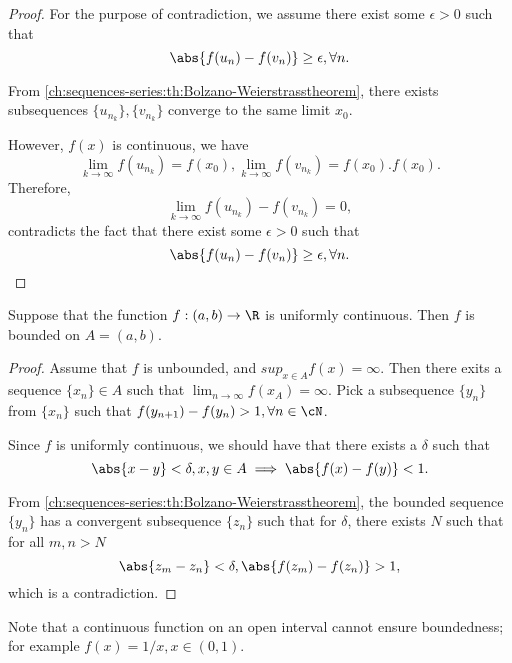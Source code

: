 \begin{refsection}
\begin{proof}
For the purpose of contradiction, we assume there exist some $\epsilon > 0$ such that 
$$\abs{f(u_n) - f(v_n)} \geq \epsilon, \forall n.$$

From \autoref{ch:sequences-series:th:Bolzano-Weierstrasstheorem}, there exists subsequences $\{u_{n_k}\},\{v_{n_k}\}$ converge to the same limit $x_0$.



However, $f(x)$ is continuous, we have
$$\lim_{k\to\infty} f(u_{n_k}) = f(x_0),\lim_{k\to\infty} f(v_{n_k}) = f(x_0). f(x_0).$$
Therefore, $$\lim_{k\to\infty} f(u_{n_k}) - f(v_{n_k}) = 0,$$
contradicts the fact that 	there exist some $\epsilon > 0$ such that 
$$\abs{f(u_n) - f(v_n)} \geq \epsilon, \forall n.$$
\end{proof}


\begin{lemma}
Suppose that the function $f:(a,b)\to \R$ is uniformly continuous. Then $f$ is bounded on $A = (a,b)$.	
\end{lemma}
\begin{proof}
Assume that $f$ is unbounded, and $sup_{x\in A}f(x) = \infty.$ Then there exits a sequence $\{x_n\}\in A$ such that $\lim_{n\to \infty} f(x_A) = \infty.$
Pick a subsequence $\{y_n\}$ from $\{x_n\}$ such that $f(y_{n+1}) - f(y_n) > 1, \forall n\in \cN$. 

Since $f$ is uniformly continuous, we should have that there exists a $\delta$ such that
$$\abs{x-y}<\delta, x,y\in A \implies \abs{f(x)-f(y)} < 1.$$ 	


From \autoref{ch:sequences-series:th:Bolzano-Weierstrasstheorem}, the bounded sequence $\{y_n\}$ has a convergent subsequence $\{z_n\}$ such that for $\delta$, there exists $N$ such that for all  $m,n > N$
$$\abs{z_m - z_n} < \delta, \abs{f(z_m)-f(z_n)} > 1,$$
which is a contradiction.  	
\end{proof}


\begin{remark}
Note that a continuous function on an open interval cannot ensure boundedness; for example $f(x)=1/x, x\in (0,1)$.	
\end{remark}


\end{refsection}
